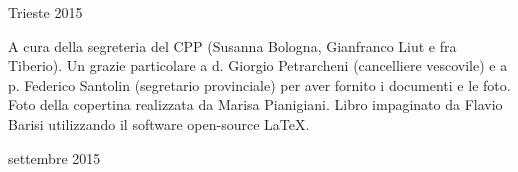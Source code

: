 \documentclass[11pt,openright,twoside]{book}
\newcommand*\cleartoleftpage{%
  \clearpage
	\thispagestyle{empty}
  \ifodd\value{page}\hbox{}\newpage\fi
}
\begin{document}
\raggedbottom %

\begin{titlepage}
        \vspace*{10mm}
			
		\vspace{10mm}
		\vspace{\fill}
		\centering \large{Trieste 2015}
\end{titlepage}








\tableofcontents
\newpage
\cleartoleftpage
\thispagestyle{empty}
\null
\vfill
\noindent \small A cura della segreteria del CPP (Susanna Bologna, Gianfranco Liut e fra Tiberio).
Un grazie particolare a d. Giorgio Petrarcheni (cancelliere vescovile) e a p. Federico Santolin (segretario provinciale) per aver fornito i documenti e le foto. Foto della copertina realizzata da Marisa Pianigiani. Libro impaginato da Flavio Barisi utilizzando 
il software open-source \LaTeX.
\bigbreak
\begin{center}
settembre 2015
\end{center}
\end{document}
